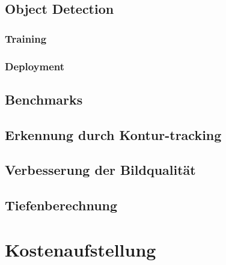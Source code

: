 \subsection{Object Detection}

\subsubsection{Training}

\subsubsection{Deployment}

\subsection{Benchmarks} \label{cap:Benchmarks}

\subsection{Erkennung durch Kontur-tracking}

\subsection{Verbesserung der Bildqualität}

\subsection{Tiefenberechnung} \label{cap:calc_depth}

\section{Kostenaufstellung}

